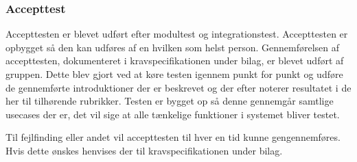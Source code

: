 \subsubsection{Accepttest}
Accepttesten er blevet udført efter modultest og integrationstest. Accepttesten er opbygget så den kan udføres af en hvilken som helst person. Gennemførelsen af accepttesten, dokumenteret i kravspecifikationen under bilag, er blevet udført af gruppen. Dette blev gjort ved at køre testen igennem punkt for punkt og udføre de gennemførte introduktioner der er beskrevet og der efter noterer resultatet i de her til tilhørende rubrikker. Testen er bygget op så denne gennemgår samtlige usecases der er, det vil sige at alle tænkelige funktioner i systemet bliver testet.

Til fejlfinding eller andet vil accepttesten til hver en tid kunne gengennemføres. Hvis dette ønskes henvises der til kravspecifikationen under bilag.   
